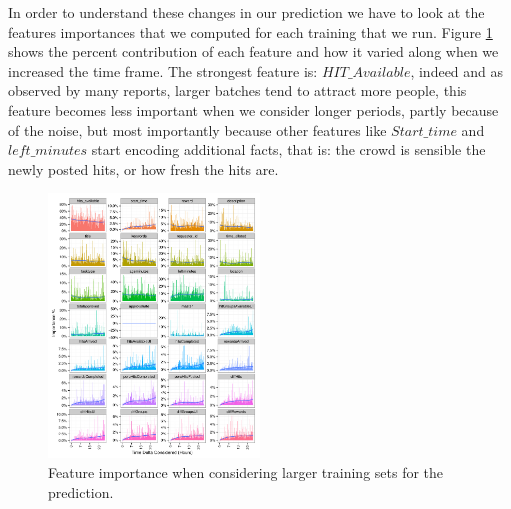 In order to understand these changes in our prediction we have to look at the features importances that we computed for each training that we run. Figure \ref{fig:importances} shows the percent contribution of each feature and how it varied along when we increased the time frame.
The strongest feature is: $HIT\_Available$, indeed and as observed by many reports, larger batches tend to attract more people, this feature becomes less important when we consider longer periods, partly because of the noise, but most importantly because other features like $Start\_time$ and $left\_minutes$ start encoding additional facts, that is: the crowd is sensible the newly posted hits, or how fresh the hits are.

\begin{figure}[htbp]
	\centering
		\includegraphics[width=0.5\textwidth]{figures/importances}
	\caption{Feature importance when considering larger training sets for the prediction.}
	\label{fig:importances}
\end{figure}
